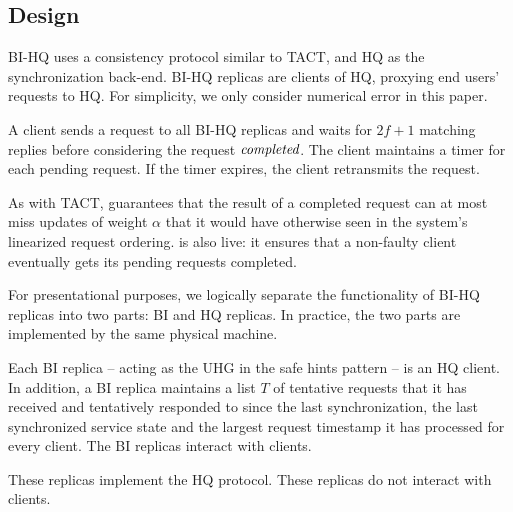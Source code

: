 \documentclass[twocolumn,10pt]{article}
\begin{document}
\subsection{Design}
BI-HQ uses a consistency protocol similar to TACT, and HQ as the
synchronization back-end.  BI-HQ replicas are clients of HQ, proxying
end users' requests to HQ. For simplicity, we only consider numerical error in
this paper.

A client sends a request to all BI-HQ replicas and waits for $2f+1$
matching replies before considering the request $\emph{completed}$.
The client maintains a timer for each pending request. If the timer
expires, the client retransmits the request.

As with TACT, \bihq guarantees that the result of a completed request
can at most miss updates of weight $\alpha$ that it would have otherwise
seen in the system's linearized request ordering.
\bihq is also live: it
ensures that a non-faulty client eventually gets its pending
requests completed.

For presentational purposes, we logically separate the functionality
of BI-HQ replicas into two parts: BI and HQ replicas. In practice, the
two parts are implemented by the same physical machine.

 Each BI replica -- acting as the UHG 
in the safe hints pattern -- is an HQ client.
In addition, a BI replica maintains a list $T$ of
tentative requests that it has received and tentatively responded to
since the last synchronization, the last synchronized service state 
and the largest request timestamp it has processed for every client.
The BI replicas interact with clients.

 These replicas implement the HQ protocol. 
These replicas do not interact with clients.

\end{document}
